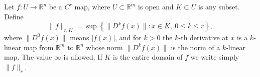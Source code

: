 Let $f: U \to \mathbb{R}^n$ be a $C^r$ map, where $U \subset \mathbb{R}^m$ is open and $K \subset U$ is any subset. Define
$$\|f\|_{r, K} = \sup \left\{ \|D^k f(x)\| : x \in K,\ 0 \leqslant k \leqslant r \right\},$$
where $\|D^0 f(x)\|$ means $|f(x)|$, and for $k > 0$ the $k$-th derivative at $x$ is a $k$-linear map from $\mathbb{R}^m$ to $\mathbb{R}^n$ whose norm $\|D^k f(x)\|$ is the norm of a $k$-linear map. The value $\infty$ is allowed. If $K$ is the entire domain of $f$ we write simply $\|f\|_r$.
